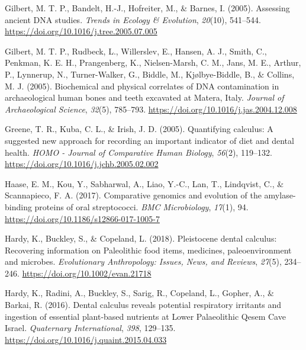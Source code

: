\documentclass[
  letterpaper,
]{book}
\newlength{\cslhangindent}
\newlength{\cslentryspacingunit} %
\newenvironment{CSLReferences}[2] %
 {%
  \setlength{\parindent}{0pt}
  \ifodd #1
  \let\oldpar\par
  \def\par{\hangindent=\cslhangindent\oldpar}
  \fi
  \setlength{\parskip}{#2\cslentryspacingunit}
 }%
 {}
\begin{document}
\begin{CSLReferences}{1}{0}
\leavevmode{}%
Gilbert, M. T. P., Bandelt, H.-J., Hofreiter, M., \& Barnes, I. (2005).
Assessing ancient {DNA} studies. \emph{Trends in Ecology \& Evolution},
\emph{20}(10), 541--544.
\url{https://doi.org/10.1016/j.tree.2005.07.005}

\leavevmode{}%
Gilbert, M. T. P., Rudbeck, L., Willerslev, E., Hansen, A. J., Smith,
C., Penkman, K. E. H., Prangenberg, K., Nielsen-Marsh, C. M., Jans, M.
E., Arthur, P., Lynnerup, N., Turner-Walker, G., Biddle, M.,
Kjølbye-Biddle, B., \& Collins, M. J. (2005). Biochemical and physical
correlates of {DNA} contamination in archaeological human bones and
teeth excavated at {Matera}, {Italy}. \emph{Journal of Archaeological
Science}, \emph{32}(5), 785--793.
\url{https://doi.org/10.1016/j.jas.2004.12.008}

\leavevmode{}%
Greene, T. R., Kuba, C. L., \& Irish, J. D. (2005). Quantifying
calculus: {A} suggested new approach for recording an important
indicator of diet and dental health. \emph{HOMO - Journal of Comparative
Human Biology}, \emph{56}(2), 119--132.
\url{https://doi.org/10.1016/j.jchb.2005.02.002}

\leavevmode{}%
Haase, E. M., Kou, Y., Sabharwal, A., Liao, Y.-C., Lan, T., Lindqvist,
C., \& Scannapieco, F. A. (2017). Comparative genomics and evolution of
the amylase-binding proteins of oral streptococci. \emph{BMC
Microbiology}, \emph{17}(1), 94.
\url{https://doi.org/10.1186/s12866-017-1005-7}

\leavevmode{}%
Hardy, K., Buckley, S., \& Copeland, L. (2018). Pleistocene dental
calculus: {Recovering} information on {Paleolithic} food items,
medicines, paleoenvironment and microbes. \emph{Evolutionary
Anthropology: Issues, News, and Reviews}, \emph{27}(5), 234--246.
\url{https://doi.org/10.1002/evan.21718}

\leavevmode{}%
Hardy, K., Radini, A., Buckley, S., Sarig, R., Copeland, L., Gopher, A.,
\& Barkai, R. (2016). Dental calculus reveals potential respiratory
irritants and ingestion of essential plant-based nutrients at {Lower
Palaeolithic Qesem Cave Israel}. \emph{Quaternary International},
\emph{398}, 129--135. \url{https://doi.org/10.1016/j.quaint.2015.04.033}


\end{CSLReferences}
\end{document}
